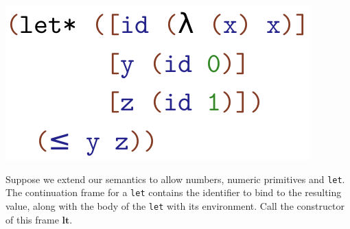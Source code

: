 \begin{center}
  \includegraphics[scale=0.5]{example0}
\end{center}


Suppose we extend our semantics to allow numbers, numeric primitives and \texttt{let}.
%
The continuation frame for a \texttt{let} contains the identifier to bind to the resulting value, along with the body of the \texttt{let} with its environment.
%
Call the constructor of this frame $\mathbf{lt}$.

